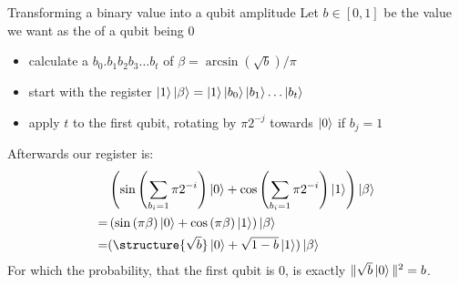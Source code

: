\documentclass{beamer}
\begin{document}
\begin{frame}{Transforming a binary value into a qubit amplitude}
Let $b\in [0,1]$ be the value we want as the  of a qubit being 0
\begin{itemize}
\item calculate a  $b_0.b_1b_2b_3\ldots b_t$ of $\beta=\arcsin(\sqrt{b})/\pi$
\item start with the register $\ket{1}\ket{\beta}=\ket{1}\ket{b_0}\ket{b_1}\ldots\ket{b_t}$
\item apply $t$  to the first qubit, rotating by $\pi 2^{-j}$ towards $\ket{0}$ if $b_j=1$
\end{itemize}
Afterwards our register is: 
\begin{align*}
&\left(\sin\left(\sum_{b_i=1} \pi 2^{-i}\right)\ket{0}
+\cos\left(\sum_{b_i=1} \pi 2^{-i}\right)\ket{1}\right)
 \ket{\beta}\\
=&\left(\sin\left(\pi\beta\right)\ket{0}
+\cos\left(\pi\beta\right)\ket{1}\right)
 \ket{\beta}\\
=&(\structure{\sqrt{b}}\ket{0}+\sqrt{1-b}\ket{1})\ket{\beta}
\end{align*}
For which the probability, that the first qubit is 0, is exactly $\|\sqrt{b}\ket{0}\|^2=b$.
\end{frame}
\end{document}
